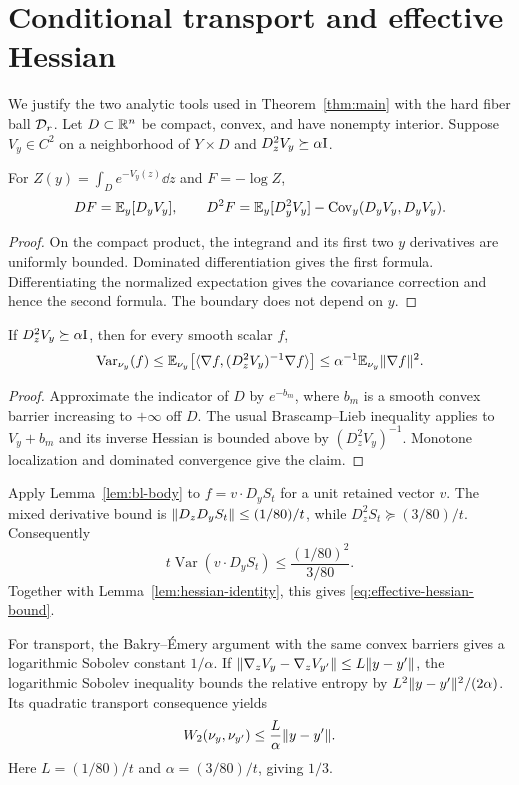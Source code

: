 \section{Conditional transport and effective Hessian}\label{app:marginal}

We justify the two analytic tools used in Theorem~\ref{thm:main} with the
hard fiber ball $\mathcal D_r$.  Let $D\subset\mathbb R^n$ be compact, convex, and have
nonempty interior.  Suppose $V_y\in C^2$ on a neighborhood of
$Y\times D$ and $D_z^2V_y\succeq\alpha\mathrm I$.

\begin{lemma}\label{lem:hessian-identity}
For $Z(y)=\int_De^{-V_y(z)}\dd z$ and $F=-\log Z$,
\[
 DF=\mathbb E_y[D_yV_y],\qquad
 D^2F=\mathbb E_y[D_y^2V_y]-\operatorname{Cov}_y(D_yV_y,D_yV_y).
\]
\end{lemma}

\begin{proof}
On the compact product, the integrand and its first two $y$ derivatives are
uniformly bounded.  Dominated differentiation gives the first formula.
Differentiating the normalized expectation gives the covariance correction
and hence the second formula.  The boundary does not depend on $y$.
\end{proof}

\begin{lemma}\label{lem:bl-body}
If $D_z^2V_y\succeq\alpha\mathrm I$, then for every smooth scalar $f$,
\[
 \operatorname{Var}_{\nu_y}(f)
 \le\mathbb E_{\nu_y}\!\left[\langle \nabla f,(D_z^2V_y)^{-1}\nabla f\rangle\right]
 \le\alpha^{-1}\mathbb E_{\nu_y}\lVert \nabla f\rVert^2.
\]
\end{lemma}

\begin{proof}
Approximate the indicator of $D$ by $e^{-b_m}$, where $b_m$ is a smooth convex
barrier increasing to $+\infty$ off $D$.  The usual Brascamp--Lieb inequality
\cite{BrascampLieb1976} applies to $V_y+b_m$ and its inverse Hessian is bounded
above by $(D_z^2V_y)^{-1}$.  Monotone localization and dominated convergence
give the claim.
\end{proof}

Apply Lemma~\ref{lem:bl-body} to
$f=v\cdot D_yS_t$ for a unit retained vector $v$.  The mixed derivative bound
is $\lVert D_zD_yS_t\rVert\le(1/80)/t$, while
$D_z^2S_t\succeq(3/80)/t$.  Consequently
\[
 t\operatorname{Var}(v\cdot D_yS_t)
 \le\frac{(1/80)^2}{3/80}.
\]
Together with Lemma~\ref{lem:hessian-identity}, this gives
\eqref{eq:effective-hessian-bound}.

For transport, the Bakry--\'{E}mery argument with the same convex barriers
gives a logarithmic Sobolev constant $1/\alpha$.  If
$\lVert \nabla_zV_y-\nabla_zV_{y'}\rVert\le L\lVert y-y'\rVert$, the logarithmic Sobolev
inequality bounds the relative entropy by
$L^2\lVert y-y'\rVert^2/(2\alpha)$.  Its quadratic transport consequence
\cite{OttoVillani2000} yields
\[
 W_2(\nu_y,\nu_{y'})\le\frac L\alpha\lVert y-y'\rVert.
\]
Here $L=(1/80)/t$ and $\alpha=(3/80)/t$, giving $1/3$.
